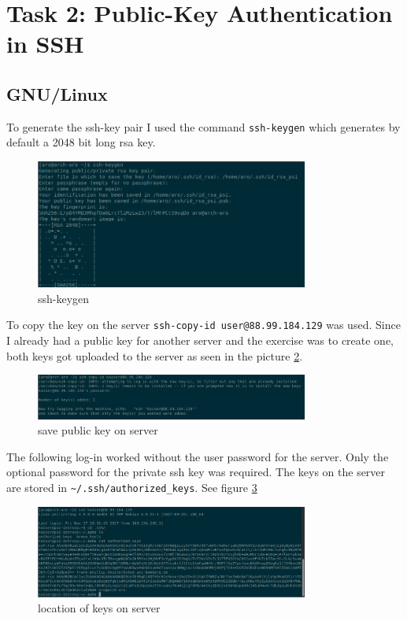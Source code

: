 \section{Task 2: Public-Key Authentication in SSH}

\subsection{GNU/Linux}
To generate the ssh-key pair I used the command \verb|ssh-keygen| which generates by default a 2048 bit long rsa key. \\

\begin{figure}
	\centering
	\includegraphics[width=0.8\textwidth]{Assignment0x01/image/ssh-keygen}
	\caption{ssh-keygen} \label{img:key-gen}
\end{figure}

To copy the key on the server \verb|ssh-copy-id user@88.99.184.129| was used. Since I already had a public key for another server and the exercise was to create one, both keys got uploaded to the server as seen in the picture \ref{img:ssh-copy-id}.

\begin{figure}
	\centering
	\includegraphics[width=0.8\textwidth]{Assignment0x01/image/ssh-copy-id}
	\caption{save public key on server} \label{img:ssh-copy-id}
\end{figure}

The following log-in worked without the user password for the server. Only the optional password for the private ssh key was required. The keys on the server are stored in \verb|~/.ssh/authorized_keys|. See figure \ref{img:key_server}
\begin{figure}
	\centering
	\includegraphics[width=0.8\textwidth]{Assignment0x01/image/ssh_login_key_path}
	\caption{location of keys on server} \label{img:key_server}
\end{figure}

